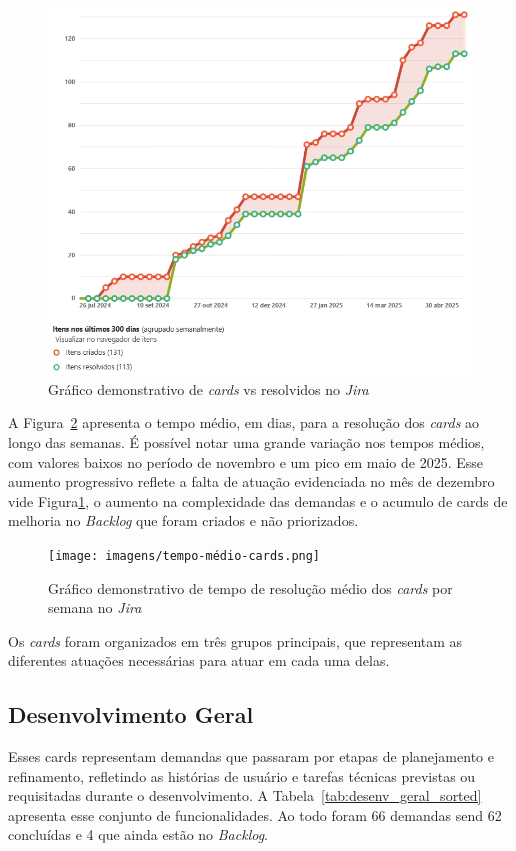 \begin{figure}[H]
    \centering
    \includegraphics[width=\textwidth]{imagens/burnup-jira.jpeg}
    \caption{Gráfico demonstrativo de \textit{cards} vs resolvidos no \textit{Jira}}
    \label{gra:cards-vs-resolvidos}
\end{figure}

A Figura~\ref{gra:tempo-medio-resolucao} apresenta o tempo médio, em dias, 
para a resolução dos \textit{cards} ao longo das semanas. É possível notar uma grande variação 
nos tempos médios, com valores baixos no período de novembro e um pico em maio de 2025. 
Esse aumento progressivo reflete a falta de atuação evidenciada no mês de dezembro vide 
Figura\ref{gra:cards-vs-resolvidos}, o aumento na complexidade das demandas e o acumulo de 
cards de melhoria no \textit{Backlog} que foram criados e não priorizados.

\begin{figure}[H]
    \centering
    \texttt{[image: imagens/tempo-médio-cards.png]}
    \caption{Gráfico demonstrativo de tempo de resolução médio dos \textit{cards} por semana no \textit{Jira}}
    \label{gra:tempo-medio-resolucao}
\end{figure}

Os \textit{cards} foram organizados em três grupos principais, que representam as diferentes
atuações necessárias para atuar em cada uma delas.
\subsection{Desenvolvimento Geral}
Esses cards representam demandas que passaram por etapas de planejamento e refinamento, 
refletindo as histórias de usuário e tarefas técnicas previstas ou requisitadas durante o desenvolvimento.
A Tabela~\ref{tab:desenv_geral_sorted} apresenta esse conjunto de funcionalidades. Ao todo foram 66 demandas
send 62 concluídas e 4 que ainda estão no \textit{Backlog}.

